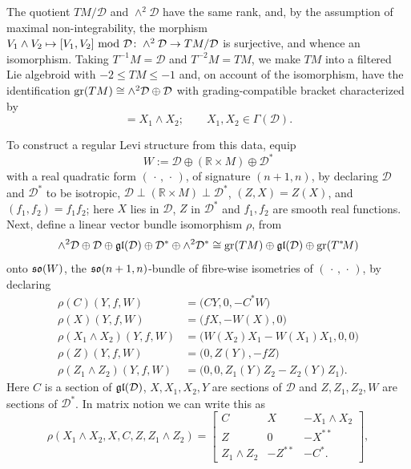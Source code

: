 \documentclass[leqno,12pt]{amsart} %
\begin{document}
The quotient $TM/{\mathcal D}$ and $\wedge^2 {\mathcal D}$ have the same rank, and, by the
assumption of maximal non-integrability, the morphism
$V_1\wedge V_2 \mapsto [V_1, V_2] ~\mathrm{mod}~ {\mathcal D} \colon \wedge^2 {\mathcal D}
\rightarrow TM/{\mathcal D}$ is surjective, and whence an isomorphism.  Taking
$T^{-1}M = {\mathcal D} $ and $T^{-2}M=TM$, we make $TM$ into a filtered Lie algebroid
with $ -2 \le TM \le -1$ and, on account of the isomorphism, have the identification
$\operatorname{\operatorname{gr}}(TM) \cong \wedge^2 {\mathcal D} \oplus {\mathcal D} $ with grading-compatible
bracket characterized by
\begin{equation}
  [X_1, X_2] = X_1\wedge X_2;\qquad  X_1, X_2 \in \Gamma({\mathcal D}).\label{brillig}
\end{equation}

To construct a regular Levi structure from this data, equip
$$W := {\mathcal D} \oplus ({\mathbb R} \times M) \oplus {\mathcal D}^*$$ with a real quadratic
form $(\,\cdot\,,\,\cdot\,)$, of signature $(n+1, n)$, by declaring ${\mathcal D} $ and
${\mathcal D}^*$ to be isotropic,
${\mathcal D} \perp ({\mathbb R} \times M) \perp {\mathcal D}^*$, $(Z, X) = Z(X)$, and
$(f_1, f_2) = f_1f_2$; here $X$ lies in ${\mathcal D} $, $Z$ in ${\mathcal D}^*$ and
$f_1, f_2$ are smooth real functions. Next, define a linear vector bundle isomorphism
$\rho$, from
\begin{equation}
    \label{lab}
     \wedge^2 {\mathcal D} \oplus {\mathcal D} \oplus \mathfrak{gl}({\mathcal D}) \oplus {\mathcal
      D}^* \oplus \wedge^2 {\mathcal D}^* \cong \operatorname{\operatorname{gr}}(TM) \oplus \mathfrak{gl}({\mathcal D}) \oplus \operatorname{\operatorname{gr}}
      (T^*\!M)
\end{equation}
onto $\mathfrak{so}(W)$, the $\mathfrak{so}(n + 1, n)$-bundle of fibre-wise isometries of
$(\,\cdot\,,\,\cdot\,)$, by declaring
\begin{align*}
     \rho(C)(Y, f, W) &= \big(CY, 0, -C^*W\big)\\
     \rho(X)(Y, f, W) &= \big(fX, -W(X), 0\big)\\
     \rho(X_1\wedge X_2)(Y, f, W) &= \big(W(X_2)X_1-W(X_1)X_1, 0, 0\big)\\
     \rho(Z)(Y, f, W) &= \big(0, Z(Y), -fZ\big)\\
     \rho(Z_1\wedge Z_2)(Y, f, W) &= \big(0, 0, Z_1(Y)Z_2-Z_2(Y)Z_1\big).
\end{align*}
Here $C$ is a section of $\mathfrak{gl}({\mathcal D})$, $X, X_1, X_2, Y$ are sections of
${\mathcal D} $ and $Z, Z_1, Z_2, W$ are sections of ${\mathcal D}^*$.  In matrix notion
we can write this as
\begin{equation*}
    \rho(X_1\wedge X_2, X, C, Z, Z_1\wedge Z_2)=
    \begin{bmatrix}
      C & X & -X_1\wedge X_2\\ Z & 0 & -X^{**}\\ Z_1\wedge Z_2 & -Z^{**} & -C^*.
    \end{bmatrix},
\end{equation*}
\end{document}
